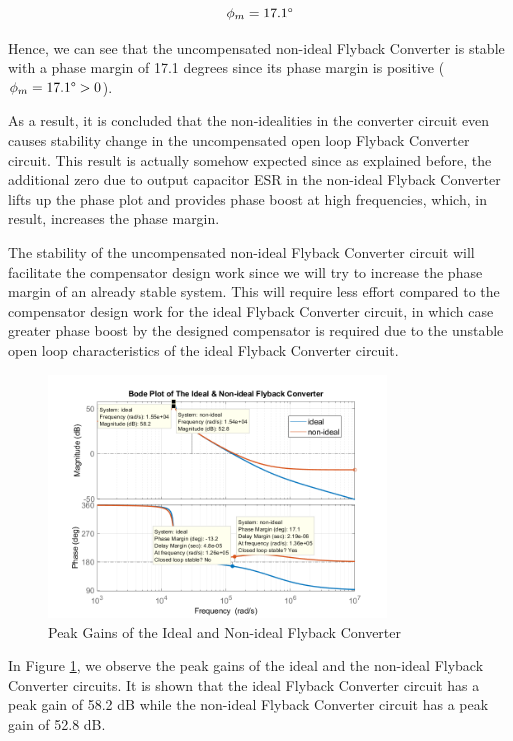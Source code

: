 $$ \phi_m = 17.1\degree $$

Hence, we can see that the uncompensated non-ideal Flyback Converter is stable with a phase margin of 17.1 degrees since its phase margin is positive ($ \phi_m = 17.1\degree > 0 $).

As a result, it is concluded that the non-idealities in the converter circuit even causes stability change in the uncompensated open loop Flyback Converter circuit. This result is actually somehow expected since as explained before, the additional zero due to output capacitor ESR in the non-ideal Flyback Converter lifts up the phase plot and provides phase boost at high frequencies, which, in result, increases the phase margin.

The stability of the uncompensated non-ideal Flyback Converter circuit will facilitate the compensator design work since we will try to increase the phase margin of an already stable system. This will require less effort compared to the compensator design work for the ideal Flyback Converter circuit, in which case greater phase boost by the designed compensator is required due to the unstable open loop characteristics of the ideal Flyback Converter circuit.

\begin{figure}[H]
\begin{center}
\includegraphics[width=0.8\textwidth]{bode_plots/bode4.png}
\caption{Peak Gains of the Ideal and Non-ideal Flyback Converter}
\label{com:bode4}
\end{center}
\end{figure}

In Figure \ref{com:bode4}, we observe the peak gains of the ideal and the non-ideal Flyback Converter circuits. It is shown that the ideal Flyback Converter circuit has a peak gain of 58.2 dB while the non-ideal Flyback Converter circuit has a peak gain of 52.8 dB.


